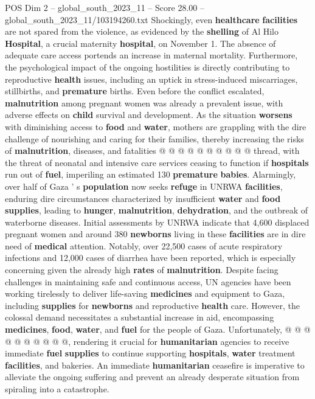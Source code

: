 \begin{textsample}{POS Dim 2 – global\_south\_2023\_11 – Score 28.00 – global\_south\_2023\_11/103194260.txt}
Shockingly, even \textbf{healthcare} \textbf{facilities} are not spared from the violence, as evidenced by the \textbf{shelling} of Al Hilo \textbf{Hospital}, a crucial maternity \textbf{hospital}, on November 1.
The absence of adequate care access portends an increase in maternal mortality.
Furthermore, the psychological impact of the ongoing hostilities is directly contributing to reproductive \textbf{health} issues, including an uptick in stress-induced miscarriages, stillbirths, and \textbf{premature} births.
Even before the conflict escalated, \textbf{malnutrition} among pregnant women was already a prevalent issue, with adverse effects on \textbf{child} survival and development.
As the situation \textbf{worsens} with diminishing access to \textbf{food} and \textbf{water}, mothers are grappling with the dire challenge of nourishing and caring for their families, thereby increasing the risks of \textbf{malnutrition}, diseases, and fatalities @ @ @ @ @ @ @ @ @ @ thread, with the threat of neonatal and intensive care services ceasing to function if \textbf{hospitals} run out of \textbf{fuel}, imperiling an estimated 130 \textbf{premature} \textbf{babies}.
Alarmingly, over half of Gaza ' s \textbf{population} now seeks \textbf{refuge} in UNRWA \textbf{facilities}, enduring dire circumstances characterized by insufficient \textbf{water} and \textbf{food} \textbf{supplies}, leading to \textbf{hunger}, \textbf{malnutrition}, \textbf{dehydration}, and the outbreak of waterborne diseases.
Initial assessments by UNRWA indicate that 4,600 displaced pregnant women and around 380 \textbf{newborns} living in these \textbf{facilities} are in dire need of \textbf{medical} attention.
Notably, over 22,500 cases of acute respiratory infections and 12,000 cases of diarrhea have been reported, which is especially concerning given the already high \textbf{rates} of \textbf{malnutrition}.
Despite facing challenges in maintaining safe and continuous access, UN agencies have been working tirelessly to deliver life-saving \textbf{medicines} and equipment to Gaza, including \textbf{supplies} for \textbf{newborns} and reproductive \textbf{health} care.
However, the colossal demand necessitates a substantial increase in aid, encompassing \textbf{medicines}, \textbf{food}, \textbf{water}, and \textbf{fuel} for the people of Gaza.
Unfortunately, @ @ @ @ @ @ @ @ @ @, rendering it crucial for \textbf{humanitarian} agencies to receive immediate \textbf{fuel} \textbf{supplies} to continue supporting \textbf{hospitals}, \textbf{water} treatment \textbf{facilities}, and bakeries.
An immediate \textbf{humanitarian} ceasefire is imperative to alleviate the ongoing suffering and prevent an already desperate situation from spiraling into a catastrophe.

\end{textsample}
